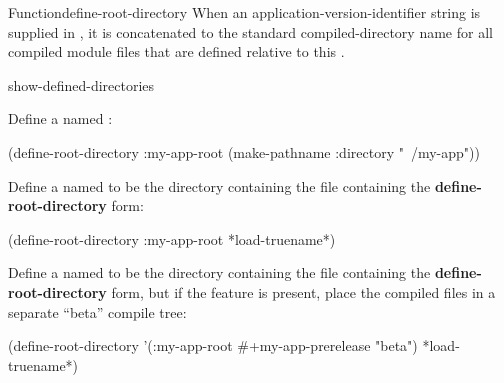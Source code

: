 \documentclass[10pt,twoside,english,pdftex]{article}
\begin{document}
\begin{functiondoc}{Function}{define-root-directory}
When an application-version-identifier string is supplied in , it
is concatenated to the standard  compiled-directory name
for all compiled module files that are defined relative to this
.

\begin{alsos}{show-defined-directories}
\end{alsos}

\fnexamples Define a  named :
%
\W\supp
\begin{example}
  (define-root-directory :my-app-root 
    (make-pathname :directory "~/my-app"))
\end{example}
%
Define a  named  to be the directory
containing the file containing the \textbf{define-root-directory} form:
%
\W\supp\notpretop
\begin{example}
  (define-root-directory :my-app-root *load-truename*)
\end{example}
%
Define a  named  to be the directory
containing the file containing the \textbf{define-root-directory} form, but if
the  feature is present, place the compiled files in
a separate ``beta'' compile tree:
%
\W\supp\notpretop
\begin{example}
  (define-root-directory '(:my-app-root #+my-app-prerelease "beta")
    *load-truename*)
\end{example}

\end{functiondoc}

\end{document}
